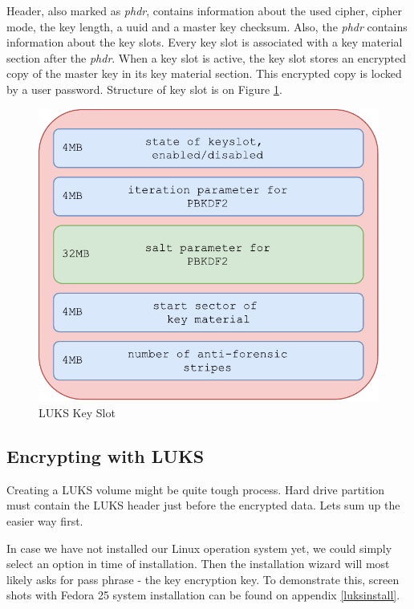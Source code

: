 Header, also marked as {\it phdr}, contains information about the used cipher, cipher mode, the key length, a uuid and a master key checksum.
Also, the {\it phdr} contains information about the key slots.
Every key slot is associated with a key material section after the {\it phdr}.
When a key slot is active, the key slot stores an encrypted copy of the master key in its key material section.
This encrypted copy is locked by a user password.
Structure of key slot is on Figure \ref{fig:luksslot}.

\begin{figure}[h]
    \centering
    \includegraphics[scale=0.6]{figures/LUKSkeyslot.pdf}
    \caption{LUKS Key Slot}
    \label{fig:luksslot}
\end{figure}

\subsection{Encrypting with LUKS} 

Creating a LUKS volume might be quite tough process.
Hard drive partition must contain the LUKS header just before the encrypted data.
Lets sum up the easier way first.

In case we have not installed our Linux operation system yet, we could simply select an option in time of installation.
Then the installation wizard will most likely asks for pass phrase - the key encryption key.
To demonstrate this, screen shots with Fedora 25 system installation can be found on appendix \ref{luksinstall}.

